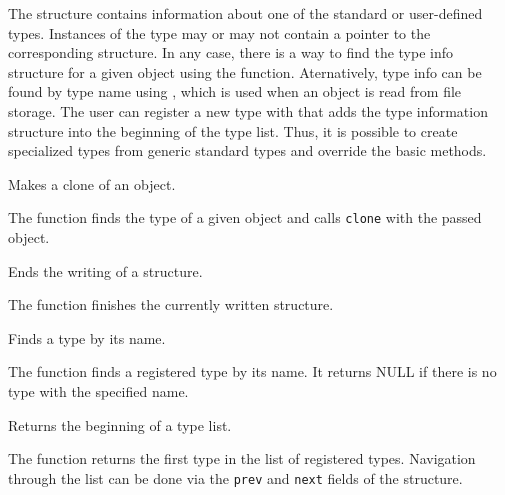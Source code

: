 The structure  contains information about one of the
standard or user-defined types. Instances of the type may or may not
contain a pointer to the corresponding  structure. In
any case, there is a way to find the type info structure for a given object
using the  function. Aternatively, type info can be found by
type name using , which is used when an object is read
from file storage. The user can register a new type with 
that adds the type information structure into the beginning of the type
list. Thus, it is possible to create specialized types from generic
standard types and override the basic methods.


Makes a clone of an object.


\begin{description}
\end{description}

The function finds the type of a given object and calls \texttt{clone} with the passed object.

Ends the writing of a structure.


\begin{description}
\end{description}

The function finishes the currently written structure.

Finds a type by its name.


\begin{description}
\end{description}

The function finds a registered type by its name. It returns NULL if there is no type with the specified name.


Returns the beginning of a type list.


The function returns the first type in the list of registered types. Navigation through the list can be done via the \texttt{prev} and \texttt{next} fields of the  structure.

